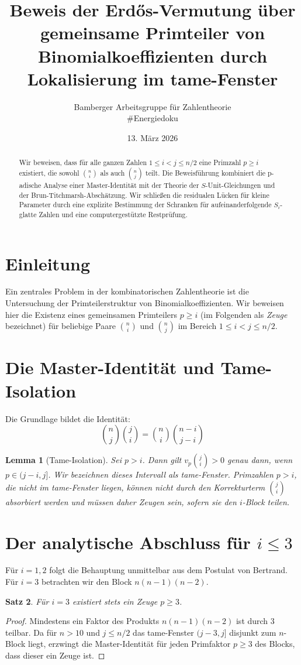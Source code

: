 \documentclass[12pt,a4paper]{article}
\title{Beweis der Erdős-Vermutung über gemeinsame Primteiler von Binomialkoeffizienten durch Lokalisierung im tame-Fenster}
\author{Bamberger Arbeitsgruppe für Zahlentheorie \\ \small{\#Energiedoku}}
\date{13. März 2026}
\newtheorem{theorem}{Satz}[section]
\newtheorem{lemma}[theorem]{Lemma}
\begin{document}
	
	\maketitle
	
	\begin{abstract}
		Wir beweisen, dass für alle ganzen Zahlen $1 \le i < j \le n/2$ eine Primzahl $p \ge i$ existiert, die sowohl $\binom{n}{i}$ als auch $\binom{n}{j}$ teilt. Die Beweisführung kombiniert die p-adische Analyse einer Master-Identität mit der Theorie der $S$-Unit-Gleichungen und der Brun-Titchmarsh-Abschätzung. Wir schließen die residualen Lücken für kleine Parameter durch eine explizite Bestimmung der Schranken für aufeinanderfolgende $S_i$-glatte Zahlen und eine computergestützte Restprüfung.
	\end{abstract}
	
	\section{Einleitung}
	Ein zentrales Problem in der kombinatorischen Zahlentheorie ist die Untersuchung der Primteilerstruktur von Binomialkoeffizienten. Wir beweisen hier die Existenz eines gemeinsamen Primteilers $p \ge i$ (im Folgenden als \textit{Zeuge} bezeichnet) für beliebige Paare $\binom{n}{i}$ und $\binom{n}{j}$ im Bereich $1 \le i < j \le n/2$.
	
	\section{Die Master-Identität und Tame-Isolation}
	Die Grundlage bildet die Identität:
	\begin{equation}
		\binom{n}{j}\binom{j}{i} = \binom{n}{i}\binom{n-i}{j-i}
	\end{equation}
	
	\begin{lemma}[Tame-Isolation]
		Sei $p > i$. Dann gilt $v_p\binom{j}{i} > 0$ genau dann, wenn $p \in (j-i, j]$. Wir bezeichnen dieses Intervall als \textit{tame-Fenster}. Primzahlen $p > i$, die nicht im tame-Fenster liegen, können nicht durch den Korrekturterm $\binom{j}{i}$ absorbiert werden und müssen daher Zeugen sein, sofern sie den $i$-Block teilen.
	\end{lemma}
	
	\section{Der analytische Abschluss für $i \le 3$}
	Für $i=1, 2$ folgt die Behauptung unmittelbar aus dem Postulat von Bertrand. Für $i=3$ betrachten wir den Block $n(n-1)(n-2)$.
	\begin{theorem}
		Für $i=3$ existiert stets ein Zeuge $p \ge 3$.
	\end{theorem}
	\begin{proof}
		Mindestens ein Faktor des Produkts $n(n-1)(n-2)$ ist durch 3 teilbar. Da für $n > 10$ und $j \le n/2$ das tame-Fenster $(j-3, j]$ disjunkt zum $n$-Block liegt, erzwingt die Master-Identität für jeden Primfaktor $p \ge 3$ des Blocks, dass dieser ein Zeuge ist.
	\end{proof}
	
\end{document}
